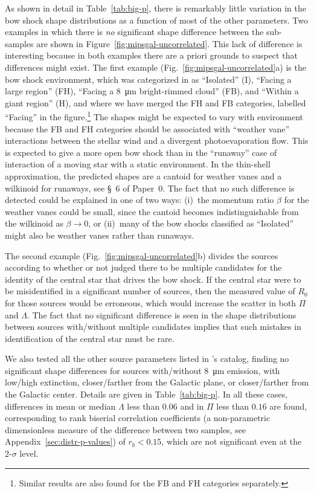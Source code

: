 \documentclass[useAMS, usenatbib, a4paper]{mnras}
\newcommand\hii{\ion{H}{ii}}
\begin{document}
As shown in detail in Table~\ref{tab:big-p}, there is remarkably
little variation in the bow shock shape distributions as a function of
most of the other parameters.  Two examples in which there is
\textit{no} significant shape difference between the sub-samples are
shown in Figure~\ref{fig:mipsgal-uncorrelated}.  This lack of
difference is interesting because in both examples there are a priori
grounds to suspect that differences might exist.  The first example
(Fig.~\ref{fig:mipsgal-uncorrelated}a) is the bow shock environment,
which was categorized in \citet{Kobulnicky:2016a} as ``Isolated'' (I),
``Facing a large \hii{} region'' (FH), ``Facing a \SI{8}{\um}
bright-rimmed cloud'' (FB), and ``Within a giant \hii{} region'' (H),
and where we have merged the FH and FB categories, labelled ``Facing''
in the figure.\footnote{Similar results are also found for the FB and
  FH categories separately.}  The shapes might be expected to vary
with environment because the FB and FH categories should be associated
with ``weather vane'' interactions \citep{Povich:2008a} between the
stellar wind and a divergent photoevaporation flow.  This is expected
to give a more open bow shock than in the ``runaway'' case of
interaction of a moving star with a static environment.  In the
thin-shell approximation, the predicted shapes are a cantoid for
weather vanes and a wilkinoid for runaways, see \S~6 of Paper~0.  The
fact that no such difference is detected could be explained in one of
two ways: (i)~the momentum ratio \(\beta\) for the weather vanes could be
small, since the cantoid becomes indistinguishable from the wilkinoid
as \(\beta \to 0\), or (ii)~many of the bow shocks classified as
``Isolated'' might also be weather vanes rather than runaways.

The second example (Fig.~\ref{fig:mipsgal-uncorrelated}b) divides the
sources according to whether or not \citet{Kobulnicky:2016a} judged
there to be multiple candidates for the identity of the central star
that drives the bow shock.  If the central star were to be
misidentified in a significant number of sources, then the measured
value of \(R_0\) for those sources would be erroneous, which would
increase the scatter in both \(\Pi\) and \(\Lambda\).  The fact that no
significant difference is seen in the shape distributions between
sources with/without multiple candidates implies that such mistakes in
identification of the central star must be rare.

We also tested all the other source parameters listed in
\citeauthor{Kobulnicky:2016a}'s catalog, finding no significant shape
differences for sources with/without \SI{8}{\um} emission, with
low/high extinction, closer/farther from the Galactic plane, or
closer/farther from the Galactic center. Details are given in
Table~\ref{tab:big-p}.  In all these cases, differences in mean or
median \(\Lambda\) less than \(0.06\) and in \(\Pi\) less than
\(0.16\) are found, corresponding to rank biserial correlation
coefficients (a non-parametric dimensionless measure of the difference
between two samples, see Appendix~\ref{sec:distr-p-values}) of
\(r_b < 0.15\), which are not significant even at the 2-\(\sigma\) level.
\end{document}
